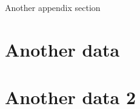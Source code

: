 Another appendix section
\section{Another data}\label{appendixB1}



\section{Another data  2}\label{appendixB2}
 